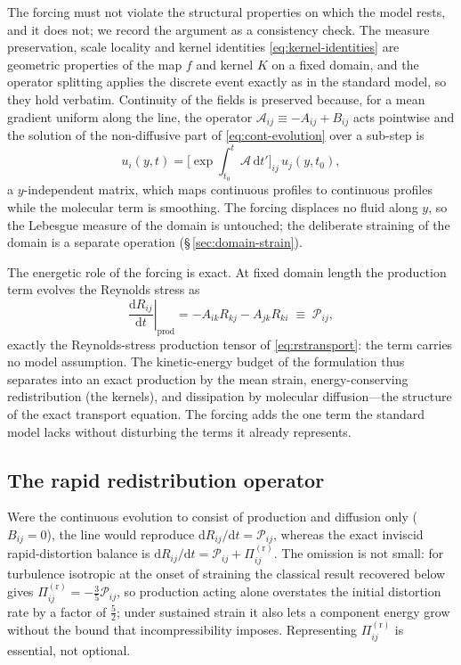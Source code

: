 \documentclass[11pt,a4paper]{article}
\newcounter{assumption}
\begin{document}
The forcing must not violate the structural properties on which the
model rests, and it does not; we record the argument as a consistency
check. The measure preservation, scale locality and kernel identities
\eqref{eq:kernel-identities} are geometric properties of the map $f$ and
kernel $K$ on a fixed domain, and the operator splitting applies the
discrete event exactly as in the standard model, so they hold verbatim.
Continuity of the fields is preserved because, for a mean gradient
uniform along the line, the operator
$\mathcal{A}_{ij}\equiv-A_{ij}+B_{ij}$ acts pointwise and the solution of
the non-diffusive part of \eqref{eq:cont-evolution} over a sub-step is
\begin{equation}
  u_i(y,t)=\big[\exp\!\textstyle\int_{t_0}^{t}
           \mathcal{A}\,\mathrm{d}t'\big]_{ij}\,u_j(y,t_0),
  \label{eq:matrixexp}
\end{equation}
a $y$-independent matrix, which maps continuous profiles to continuous
profiles while the molecular term is smoothing. The forcing displaces no
fluid along $y$, so the Lebesgue measure of the domain is untouched; the
deliberate straining of the domain is a separate operation
(\S\,\ref{sec:domain-strain}).

The energetic role of the forcing is exact. At fixed domain length the
production term evolves the Reynolds stress as
\begin{equation}
  \left.\frac{\mathrm{d}R_{ij}}{\mathrm{d}t}\right|_{\text{prod}}
  = -A_{ik}R_{kj}-A_{jk}R_{ki}
  \;\equiv\; \mathcal{P}_{ij},
  \label{eq:production-rate}
\end{equation}
exactly the Reynolds-stress production tensor of \eqref{eq:rstransport}:
the term carries no model assumption. The kinetic-energy budget of the
formulation thus separates into an exact production by the mean strain,
energy-conserving redistribution (the kernels), and dissipation by
molecular diffusion---the structure of the exact transport equation. The
forcing adds the one term the standard model lacks without disturbing the
terms it already represents.

\subsection{The rapid redistribution operator}\label{sec:rapid-kernel}

Were the continuous evolution to consist of production and diffusion only
($B_{ij}=0$), the line would reproduce
$\mathrm{d}R_{ij}/\mathrm{d}t=\mathcal{P}_{ij}$, whereas the exact
inviscid rapid-distortion balance is
$\mathrm{d}R_{ij}/\mathrm{d}t=\mathcal{P}_{ij}+\Pi^{(\mathrm r)}_{ij}$.
The omission is not small: for turbulence isotropic at the onset of
straining the classical result recovered below gives
$\Pi^{(\mathrm r)}_{ij}=-\tfrac35\mathcal{P}_{ij}$, so production acting
alone overstates the initial distortion rate by a factor of $\tfrac52$;
under sustained strain it also lets a component energy grow without the
bound that incompressibility imposes. Representing
$\Pi^{(\mathrm r)}_{ij}$ is essential, not optional.
\end{document}
